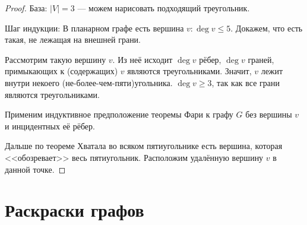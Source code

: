 \documentclass[a4paper]{report}
\begin{document}
{\begin{proof}
            База: $|V| = 3$ --- можем нарисовать подходящий треугольник.

            Шаг индукции: В планарном графе есть вершина $v : \deg v \le 5$.
            Докажем, что есть такая, не лежащая на внешней грани.

            Рассмотрим такую вершину $v$.
            Из неё исходит $\deg v$ рёбер, $\deg v$ граней, примыкающих к (содержащих) $v$ являются треугольниками.
            Значит, $v$ лежит внутри некоего (не-более-чем-пяти)угольника. $\deg v \ge 3$, так как все грани являются треугольниками.

            Применим индуктивное предположение теоремы Фари к графу $G$ без вершины $v$ и инцидентных её рёбер.

            Дальше по теореме Хватала во всяком пятиугольнике есть вершина, которая <<обозревает>> весь пятиугольник.
            Расположим удалённую вершину $v$ в данной точке.
        \end{proof}}


    \section{Раскраски графов}

\end{document}
